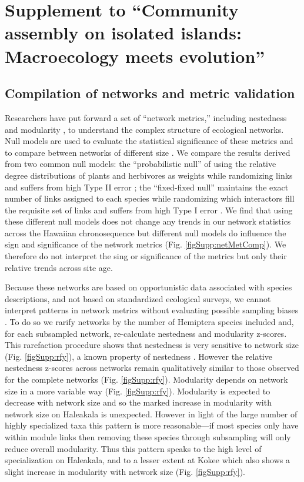 \chapter{Supplement to ``Community assembly on isolated islands:
  Macroecology meets evolution''}
\label{supp:ch2}

\section{Compilation of networks and metric validation}

Researchers have put forward a set of ``network metrics,'' including
nestedness \citep{bascompte2003, ulrich2009} and modularity
\citep{newman2004, olesen2007}, to understand the complex structure of
ecological networks. Null models are used to evaluate the statistical
significance of these metrics and to compare between networks of
different size \citep{ulrich2009}. We compare the results derived from
two common null models: the ``probabilistic null'' of
\cite{bascompte2003} using the relative degree distributions of plants
and herbivores as weights while randomizing links and suffers from
high Type II error \citep{ulrich2009}; the ``fixed-fixed null''
\citep{ulrich2009} maintains the exact number of links assigned to
each species while randomizing which interactors fill the requisite set
of links and suffers from high Type I error \citep{ulrich2009}. We find that
using these different null models does not change any trends in our
network statistics across the Hawaiian chronosequence but different
null models do influence the sign and significance of the network
metrics (Fig. \ref{figSupp:netMetComp}). We therefore do not interpret
the sing or significance of the metrics but only their relative trends
across site age.

Because these networks are based on opportunistic data associated with
species descriptions, and not based on standardized ecological
surveys, we cannot interpret patterns in network metrics without
evaluating possible sampling biases \citep{nielsen2007, gibson2011,
  rivera2012}.  To do so we rarify networks by the number of Hemiptera
species included and, for each subsampled network, re-calculate
nestedness and modularity z-scores. This rarefaction procedure shows
that nestedness is very sensitive to network size
(Fig. \ref{figSupp:rfy}), a known property of nestedness
\citep{nielsen2007, gibson2011, rivera2012}. However the relative
nestedness z-scores across networks remain qualitatively similar to
those observed for the complete networks (Fig. \ref{figSupp:rfy}).
Modularity depends on network size in a more variable way
(Fig. \ref{figSupp:rfy}). Modularity is expected to decrease with
network size \citep{rivera2012} and so the marked increase in
modularity with network size on Haleakala is unexpected. However in
light of the large number of highly specialized taxa this pattern is
more reasonable---if most species only have within module links then
removing these species through subsampling will only reduce overall
modularity.  Thus this pattern speaks to the high level of
specialization on Haleakala, and to a lesser extent at Kokee which
also shows a slight increase in modularity with network size
(Fig. \ref{figSupp:rfy}).


